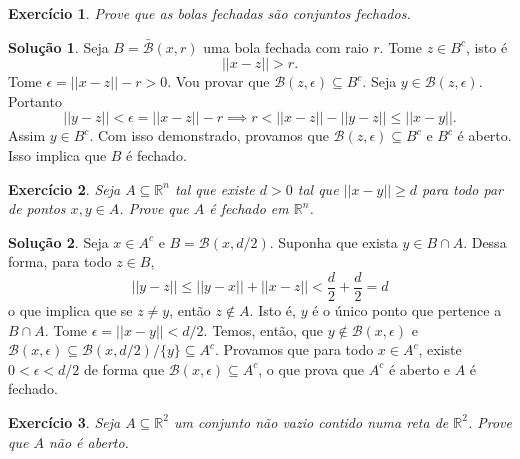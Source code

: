 \documentclass[a4paper,12pt]{article}
\newcommand{\R}{\mathbb{R}}
\newcommand{\B}{\mathcal{B}}
\theoremstyle{exer}
\newtheorem{exercise}{Exercício}
\theoremstyle{definition}
\newtheorem{solution}{Solução}
\theoremstyle{plain}
\begin{document}
\begin{exercise}
    Prove que as bolas fechadas são conjuntos fechados.
\end{exercise}

\begin{solution}
    Seja $B = \bar{\B}(x,r)$ uma bola fechada com raio $r$. Tome $z \in B^c$,
    isto é 
    $$
    ||x - z|| > r.
    $$
    Tome $\epsilon = ||x - z|| - r > 0$. Vou provar que $\B(z,\epsilon)
    \subseteq B^c$. Seja $y \in \B(z,\epsilon)$. Portanto 
    $$
    ||y - z|| < \epsilon = ||x - z|| - r \implies r < ||x - z|| - ||y - z|| \le ||x - y||.
    $$
    Assim $y \in B^c$. Com isso demonstrado, provamos que $\B(z,\epsilon)
    \subseteq B^c$ e $B^c$ é aberto. Isso implica que $B$ é fechado. 
\end{solution}

\begin{exercise}
    Seja $A \subseteq \R^n$ tal que existe $d > 0$ tal que $||x - y|| \ge d$
    para todo par de pontos $x, y \in A$. Prove que $A$ é fechado em $\R^n$.
\end{exercise}

\begin{solution}
    Seja $x \in A^c$ e $B = \B(x,d/2)$. Suponha que exista $y \in B \cap A$.
    Dessa forma, para todo $z \in B$, 
    $$
    ||y-z|| \le ||y - x|| + ||x - z|| < \frac{d}{2} + \frac{d}{2} = d
    $$
    o que implica que se $z \neq y$, então $z \not \in A$. Isto é, $y$ é o
    único ponto que pertence a $B \cap A$. Tome $\epsilon = ||x - y|| < d/2$.
    Temos, então, que $y \not \in \B(x, \epsilon)$ e $\B(x,\epsilon) \subseteq
    \B(x, d/2) / \{y\} \subseteq A^c$. Provamos que para todo $x \in A^c$,
    existe $0 < \epsilon < d/2$ de forma que $\B(x,\epsilon) \subseteq A^c$, o
  que prova que $A^c$ é aberto e $A$ é fechado.   
\end{solution}

\begin{exercise}
    Seja $A \subseteq \R^2$ um conjunto não vazio contido numa reta de $\R^2$. Prove que $A$ não é
    aberto.
\end{exercise}
\end{document}
